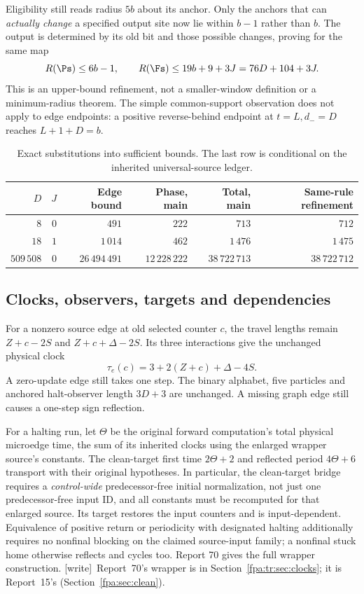 \documentclass[11pt,a4paper]{article}
\numberwithin{equation}{section}
\newcommand{\wtag}{\textup{[write]}}
\begin{document}
Eligibility still reads radius $5b$ about its anchor. Only the anchors that can \emph{actually change} a specified output site now lie within $b-1$ rather than $b$. The output is determined by its old bit and those possible changes, proving for the same map
\begin{equation}\label{fpa:sw:eq:refined}
R(\Ps)\le6b-1,\qquad R(\Fs)\le19b+9+3J=76D+104+3J.
\end{equation}
This is an upper-bound refinement, not a smaller-window definition or a minimum-radius theorem. The simple common-support observation does not apply to edge endpoints: a positive reverse-behind endpoint at $t=L,d_-=D$ reaches $L+1+D=b$.

\begin{table}[htbp]\centering\small
\begin{tabular}{rrrrrr}\toprule
$D$ & $J$ & Edge bound & Phase, main & Total, main & Same-rule refinement\\\midrule
$8$ & $0$ & $491$ & $222$ & $713$ & $712$\\
$18$ & $1$ & $1\,014$ & $462$ & $1\,476$ & $1\,475$\\
$509\,508$ & $0$ & $26\,494\,491$ & $12\,228\,222$ & $38\,722\,713$ & $38\,722\,712$\\\bottomrule
\end{tabular}
\caption{Exact substitutions into sufficient bounds. The last row is conditional on the inherited universal-source ledger.}
\end{table}

\subsection{Clocks, observers, targets and dependencies}
For a nonzero source edge at old selected counter $c$, the travel lengths remain $Z+c-2S$ and $Z+c+\Delta-2S$. Its three interactions give the unchanged physical clock
\[
\tau_e(c)=3+2(Z+c)+\Delta-4S.
\]
A zero-update edge still takes one step. The binary alphabet, five particles and anchored halt-observer length $3D+3$ are unchanged. A missing graph edge still causes a one-step sign reflection.

For a halting run, let $\Theta$ be the original forward computation's total physical microedge time, the sum of its inherited clocks using the enlarged wrapper source's constants. The clean-target first time $2\Theta+2$ and reflected period $4\Theta+6$ transport with their original hypotheses. In particular, the clean-target bridge requires a \emph{control-wide} predecessor-free initial normalization, not just one predecessor-free input ID, and all constants must be recomputed for that enlarged source. Its target restores the input counters and is input-dependent. Equivalence of positive return or periodicity with designated halting additionally requires no nonfinal blocking on the claimed source-input family; a nonfinal stuck home otherwise reflects and cycles too. Report 70 gives the full wrapper construction.
\wtag\ Report~70's wrapper is in Section~\ref{fpa:tr:sec:clocks}; it is Report~15's (Section~\ref{fpa:sec:clean}).
\end{document}

